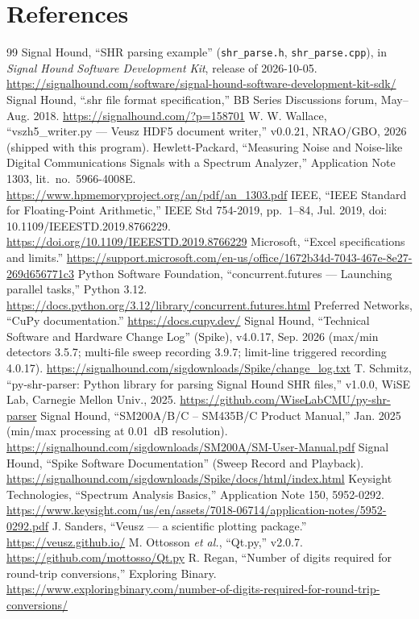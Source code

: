 \documentclass[11pt,a4paper]{article}
\newcommand{\code}[1]{\texttt{#1}}
\begin{document}
\section*{References}
\begin{thebibliography}{99}
 Signal Hound, ``SHR parsing example'' (\code{shr\_parse.h}, \code{shr\_parse.cpp}), in \emph{Signal Hound Software Development Kit}, release of 2026-10-05. \url{https://signalhound.com/software/signal-hound-software-development-kit-sdk/}
 Signal Hound, ``.shr file format specification,'' BB Series Discussions forum, May--Aug. 2018. \url{https://signalhound.com/?p=158701}
 W. W. Wallace, ``vszh5\_writer.py --- Veusz HDF5 document writer,'' v0.0.21, NRAO/GBO, 2026 (shipped with this program).
 Hewlett-Packard, ``Measuring Noise and Noise-like Digital Communications Signals with a Spectrum Analyzer,'' Application Note 1303, lit.\ no.\ 5966-4008E. \url{https://www.hpmemoryproject.org/an/pdf/an_1303.pdf}
 IEEE, ``IEEE Standard for Floating-Point Arithmetic,'' IEEE Std 754-2019, pp.~1--84, Jul. 2019, doi: 10.1109/IEEESTD.2019.8766229. \url{https://doi.org/10.1109/IEEESTD.2019.8766229}
 Microsoft, ``Excel specifications and limits.'' \url{https://support.microsoft.com/en-us/office/1672b34d-7043-467e-8e27-269d656771c3}
 Python Software Foundation, ``concurrent.futures --- Launching parallel tasks,'' Python 3.12. \url{https://docs.python.org/3.12/library/concurrent.futures.html}
 Preferred Networks, ``CuPy documentation.'' \url{https://docs.cupy.dev/}
 Signal Hound, ``Technical Software and Hardware Change Log'' (Spike), v4.0.17, Sep. 2026 (max/min detectors 3.5.7; multi-file sweep recording 3.9.7; limit-line triggered recording 4.0.17). \url{https://signalhound.com/sigdownloads/Spike/change_log.txt}
 T. Schmitz, ``py-shr-parser: Python library for parsing Signal Hound SHR files,'' v1.0.0, WiSE Lab, Carnegie Mellon Univ., 2025. \url{https://github.com/WiseLabCMU/py-shr-parser}
 Signal Hound, ``SM200A/B/C -- SM435B/C Product Manual,'' Jan. 2025 (min/max processing at 0.01~dB resolution). \url{https://signalhound.com/sigdownloads/SM200A/SM-User-Manual.pdf}
 Signal Hound, ``Spike Software Documentation'' (Sweep Record and Playback). \url{https://signalhound.com/sigdownloads/Spike/docs/html/index.html}
 Keysight Technologies, ``Spectrum Analysis Basics,'' Application Note 150, 5952-0292. \url{https://www.keysight.com/us/en/assets/7018-06714/application-notes/5952-0292.pdf}
 J. Sanders, ``Veusz --- a scientific plotting package.'' \url{https://veusz.github.io/}
 M. Ottosson \emph{et al.}, ``Qt.py,'' v2.0.7. \url{https://github.com/mottosso/Qt.py}
 R. Regan, ``Number of digits required for round-trip conversions,'' Exploring Binary. \url{https://www.exploringbinary.com/number-of-digits-required-for-round-trip-conversions/}
\end{thebibliography}
\end{document}
